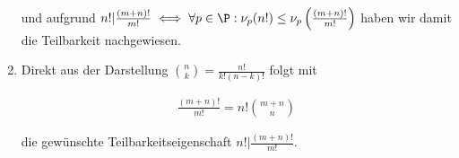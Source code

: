 \begin{solution}
\begin{enumerate}[label = (\alph*)]
    und aufgrund $n! | \frac{(m+n)!}{m!} \iff \forall p \in \P: \nu_p(n!) \leq \nu_p\left(\frac{(m+n)!}{m!}\right)$
    haben wir damit die Teilbarkeit nachgewiesen.

    \item Direkt aus der Darstellung $\binom{n}{k} = \frac{n!}{k!(n-k)!}$ folgt mit
    
    \begin{align*}
        \frac{(m+n)!}{m!} = n!\binom{m+n}{n}
    \end{align*}

    die gewünschte Teilbarkeitseigenschaft $n! | \frac{(m+n)!}{m!}$.
\end{enumerate}

\end{solution}

